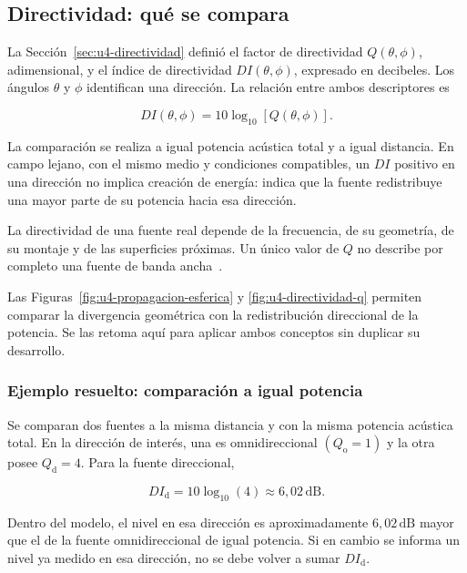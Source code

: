 \subsection{Directividad: qué se compara}
\label{sec:u9-directividad}

La Sección~\ref{sec:u4-directividad} definió el factor de directividad
\(Q(\theta,\phi)\), adimensional, y el índice de directividad
\(DI(\theta,\phi)\), expresado en decibeles. Los ángulos \(\theta\) y \(\phi\)
identifican una dirección. La relación entre ambos descriptores es

\begin{equation}
    DI(\theta,\phi)
      =10\log_{10}\!\left[Q(\theta,\phi)\right].
    \label{eq:u9-indice-directividad}
\end{equation}

La comparación se realiza a igual potencia acústica total y a igual distancia.
En campo lejano, con el mismo medio y condiciones compatibles, un \(DI\)
positivo en una dirección no implica creación de energía: indica que la fuente
redistribuye una mayor parte de su potencia hacia esa dirección.

La directividad de una fuente real depende de la frecuencia, de su
geometría, de su montaje y de las superficies próximas. Un único valor de
\(Q\) no describe por completo una fuente de banda ancha~\cite{xiangBlauert2021,iso9613_1_1993}.

Las Figuras~\ref{fig:u4-propagacion-esferica} y
\ref{fig:u4-directividad-q} permiten comparar la divergencia geométrica con
la redistribución direccional de la potencia. Se las retoma aquí para aplicar
ambos conceptos sin duplicar su desarrollo.

\subsubsection*{Ejemplo resuelto: comparación a igual potencia}

Se comparan dos fuentes a la misma distancia y con la misma potencia acústica
total. En la dirección de interés, una es omnidireccional
\((Q_\mathrm{o}=1)\) y la otra posee \(Q_\mathrm{d}=4\). Para la fuente
direccional,

\[
    DI_\mathrm{d}
      =10\log_{10}(4)
      \approx6{,}02\,\text{dB}.
\]

Dentro del modelo, el nivel en esa dirección es aproximadamente
\(6{,}02\,\text{dB}\) mayor que el de la fuente omnidireccional de igual
potencia. Si en cambio se informa un nivel ya medido en esa dirección, no se
debe volver a sumar \(DI_\mathrm{d}\).

